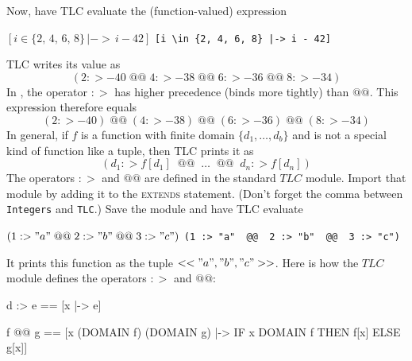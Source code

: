 \documentclass[fleqn,leqno]{article}
\begin{document}
Now, 
have TLC evaluate the (function-valued) expression 
\begin{twocols}
  $[i \in \{2,\, 4,\, 6,\, 8\}\, |-> \, i - 42]$
\midcol
\verb=[i \in {2, 4, 6, 8} |-> i - 42]=
\end{twocols}
TLC writes its value as%
 \[(2 :> -40 \;@@\; 4 :> -38 \;@@\; 6 :> -36 \;@@\; 8 :> -34)\]
In \tlaplus, the operator $:>$ has higher precedence (binds more
tightly) than $@@$.  This expression therefore equals
 \[ (2 :> -40) \;@@\; (4 :> -38) \;@@\; (6 :> -36) \;@@\; (8 :> -34)
 \]
In general, if $f$ is a function with finite domain 
 $\{d_{1}, \ldots, d_{b}\}$
and is not a special kind of function like a tuple, then TLC
prints it as
 \[ (d_{1} :> f[d_{1}] \;\;@@\;\; \ldots 
    \;\;@@\;\; d_{n} :> f[d_{n}])
 \]
The operators $:>$ and $@@$ are defined in the standard $TLC$ module.
Import that module by adding it to the \textsc{extends} statement.
(Don't forget the comma between \texttt{Integers} and \texttt{TLC}.)
Save the module and have TLC evaluate
\begin{twocols}
$(1 :> "a"  \; @@  \; 2 :> "b"  \; @@  \; 3 :> "c")$
\midcol
\verb|(1 :> "a"  @@  2 :> "b"  @@  3 :> "c")|
\end{twocols}
It prints this function as the tuple $<<"a", "b", "c">>$.  Here is how
the $TLC$ module defines the operators $:>$ and $@@$:


\begin{widedisplay}
\begin{notla}
d  :> e  == [x  |-> e]

f @@ g == [x \in (DOMAIN f) \cup (DOMAIN g) |-> IF x \in DOMAIN f THEN f[x] ELSE g[x]]
\end{notla}
\begin{tlatex}
\par\vspace{8.0pt}%
\end{tlatex}
\end{widedisplay}

\vspace{0pt} %
\end{document}
